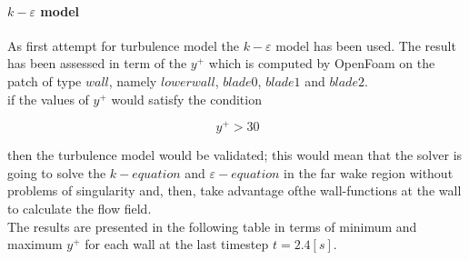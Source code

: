 \documentclass[a4paper,12pt]{article}
\begin{document}
\begin{figure}[H]
\centering
{}


\end{figure}




\paragraph{$k-\varepsilon$ model}
As first attempt for turbulence model the $k-\varepsilon$ model has been used.
The result has been assessed in term of the $y^+ $ which is computed by OpenFoam on the patch of type $wall$, namely $lower wall$, $blade0$, $blade1$ and $blade2$.\\
if the values of $y^+ $ would satisfy the condition 

\begin{equation}
\ y^+ > 30
\end{equation}

then the turbulence model would be validated; this would mean that the solver is going to solve the $k-equation $ and $\varepsilon-equation $ in the far wake region without problems of singularity and, then, take advantage ofthe wall-functions at the wall to calculate the flow field.\\
The results are presented in the following table in terms of minimum and maximum $y^+ $ for each wall at the last timestep $t = 2.4[s]$.
\end{document}
